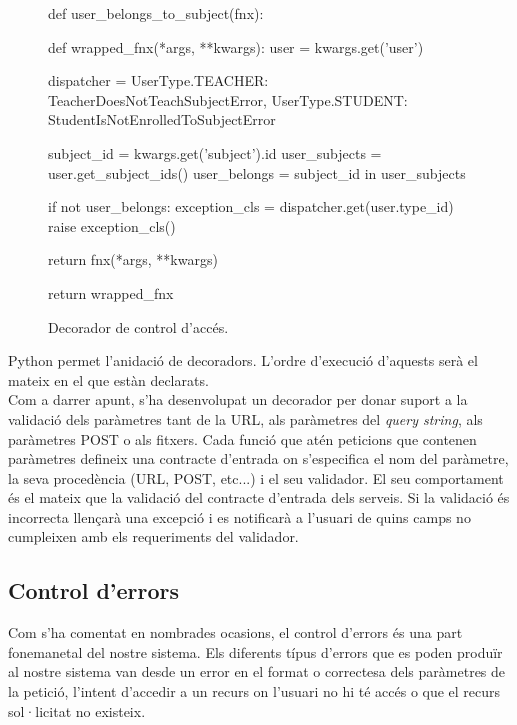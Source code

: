 \begin{figure}[h!]
	\begin{python}
def user_belongs_to_subject(fnx):
	
	def wrapped_fnx(*args, **kwargs):
		user = kwargs.get('user')
		
		dispatcher = {
			UserType.TEACHER: TeacherDoesNotTeachSubjectError,
			UserType.STUDENT: StudentIsNotEnrolledToSubjectError
		}
		
		subject_id = kwargs.get('subject').id
		user_subjects = user.get_subject_ids()
		user_belongs = subject_id in user_subjects
		
		if not user_belongs:
			exception_cls = dispatcher.get(user.type_id)
			raise exception_cls()
		
		return fnx(*args, **kwargs)

	return wrapped_fnx
	\end{python}
	\label{fig:decorador_control_acces}
	\caption{Decorador de control d'accés.}
\end{figure}

Python permet l'anidació de decoradors. L'ordre d'execució d'aquests serà el mateix en el que estàn declarats. \\

Com a darrer apunt, s'ha desenvolupat un decorador per donar suport a la validació dels paràmetres tant de la \ac{URL}, als paràmetres del \emph{query string}, als paràmetres POST o als fitxers. Cada funció que atén peticions que contenen paràmetres defineix una contracte d'entrada on s'especifica el nom del paràmetre, la seva procedència (\ac{URL}, POST, etc...) i el seu validador. El seu comportament és el mateix que la validació del contracte d'entrada dels serveis. Si la validació és incorrecta llençarà una excepció i es notificarà a l'usuari de quins camps no cumpleixen amb els requeriments del validador.

\subsection{Control d'errors}

Com s'ha comentat en nombrades ocasions, el control d'errors és una part fonemanetal del nostre sistema. Els diferents típus d'errors que es poden produïr al nostre sistema van desde un error en el format o correctesa dels paràmetres de la petició, l'intent d'accedir a un recurs on l'usuari no hi té accés o que el recurs sol·licitat no existeix.\\

